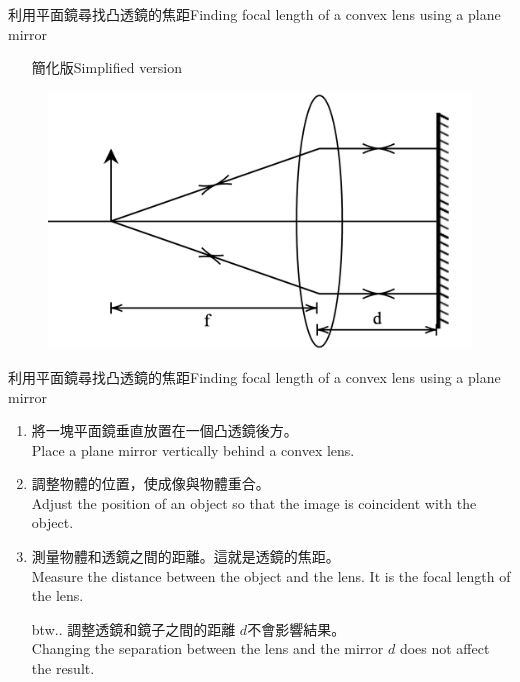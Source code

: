 \documentclass[beamer=true]{standalone}
\begin{document}
\begin{frame}{利用平面鏡尋找凸透鏡的焦距Finding focal length of a convex lens using a plane mirror}
    \begin{itemize}
        \item [] 簡化版Simplified version
    \end{itemize}
    \begin{figure}
        \centering
        \includegraphics[width=0.75\linewidth]{assets/udhe08dnue8983.png}
    \end{figure}
\end{frame}

\begin{frame}{利用平面鏡尋找凸透鏡的焦距Finding focal length of a convex lens using a plane mirror}
    \begin{enumerate}
        \setlength{\itemsep}{.6em}
        \item 將一塊平面鏡垂直放置在一個凸透鏡後方。\\Place a plane mirror vertically behind a convex lens.
        \item 調整物體的位置，使成像與物體重合。\\Adjust the position of an object so that the image is coincident with the object.
        \item 測量物體和透鏡之間的距離。這就是透鏡的焦距。\\Measure the distance between the object and the lens. It is the focal length of the lens.
    \end{enumerate}
    \begin{itemize}
        \item [btw..] 調整透鏡和鏡子之間的距離 $d$不會影響結果。\\Changing the separation between the lens and the mirror $d$ does not affect the result.
    \end{itemize}
\end{frame}
\end{document}
